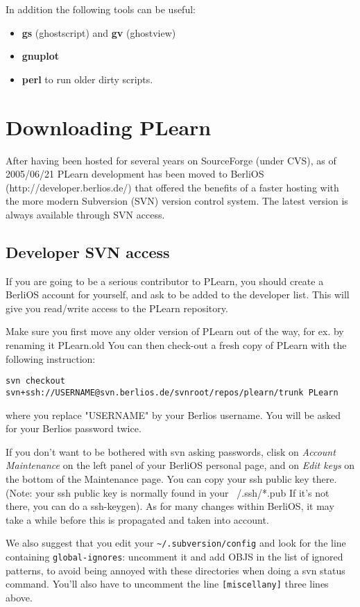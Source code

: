 \documentclass[11pt]{book}
\begin{document}
In addition the following tools can be useful:

\begin{itemize}
\item {\bf gs} (ghostscript) and {\bf gv} (ghostview)
\item {\bf gnuplot}
\item {\bf perl} to run older dirty scripts.
\end{itemize}


\section{Downloading PLearn}

After having been hosted for several years on SourceForge (under CVS), as
of 2005/06/21 PLearn development has been moved to BerliOS
(http://developer.berlios.de/) that offered the benefits of a faster
hosting with the more modern Subversion (SVN) version control system.
The latest version is always available through SVN access.  

\subsection{Developer SVN access}
If you are going to be a serious contributor to PLearn, you should create a
BerliOS account for yourself, and ask to be added to the developer list.
This will give you read/write access to the PLearn repository.

Make sure you first move any older version of PLearn out of the way, for ex. by renaming it PLearn.old
You can then check-out a fresh copy of PLearn with the following instruction:
\begin{verbatim}
svn checkout svn+ssh://USERNAME@svn.berlios.de/svnroot/repos/plearn/trunk PLearn
\end{verbatim}
where you replace "USERNAME" by your Berlios username.
You will be asked for your Berlios password twice.

If you don't want to be bothered with svn asking passwords, clisk on {\em
  Account Maintenance} on the left panel of your BerliOS personal page, and
on {\em Edit keys} on the bottom of the Maintenance page.  You can copy
your ssh public key there. (Note: your ssh public key is normally found in
your ~/.ssh/*.pub If it's not there, you can do a ssh-keygen). As for many
changes within BerliOS, it may take a while before this is propagated and
taken into account.

We also suggest that you edit your \verb!~/.subversion/config! and look for
the line containing \verb!global-ignores!: uncomment it and add OBJS in the list
of ignored patterns, to avoid being annoyed with these directories when
doing a svn status command. You'll also have to uncomment the line
\verb![miscellany]! three lines above.
\end{document}
